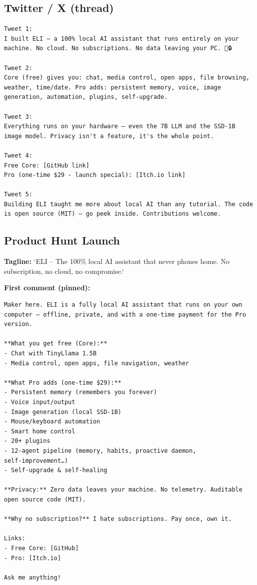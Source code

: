 \documentclass[11pt,a4paper]{article}
\begin{document}
\subsection{Twitter / X (thread)}
\begin{tcolorbox}[title=Twitter Thread, colback=cyan!5]
\begin{verbatim}
Tweet 1:
I built ELI – a 100% local AI assistant that runs entirely on your machine. No cloud. No subscriptions. No data leaving your PC. 🧠🔒

Tweet 2:
Core (free) gives you: chat, media control, open apps, file browsing, weather, time/date. Pro adds: persistent memory, voice, image generation, automation, plugins, self‑upgrade.

Tweet 3:
Everything runs on your hardware – even the 7B LLM and the SSD‑1B image model. Privacy isn't a feature, it's the whole point.

Tweet 4:
Free Core: [GitHub link]
Pro (one‑time $29 - launch special): [Itch.io link]

Tweet 5:
Building ELI taught me more about local AI than any tutorial. The code is open source (MIT) – go peek inside. Contributions welcome.
\end{verbatim}
\end{tcolorbox}

\subsection{Product Hunt Launch}
\begin{tcolorbox}[title=Product Hunt, colback=orange!5]
\textbf{Tagline:} `ELI – The 100\% local AI assistant that never phones home. No subscription, no cloud, no compromise.`

\textbf{First comment (pinned):}
\begin{verbatim}
Maker here. ELI is a fully local AI assistant that runs on your own computer – offline, private, and with a one‑time payment for the Pro version.

**What you get free (Core):**
- Chat with TinyLlama 1.5B
- Media control, open apps, file navigation, weather

**What Pro adds (one‑time $29):**
- Persistent memory (remembers you forever)
- Voice input/output
- Image generation (local SSD‑1B)
- Mouse/keyboard automation
- Smart home control
- 20+ plugins
- 12‑agent pipeline (memory, habits, proactive daemon, self‑improvement…)
- Self‑upgrade & self‑healing

**Privacy:** Zero data leaves your machine. No telemetry. Auditable open source code (MIT).

**Why no subscription?** I hate subscriptions. Pay once, own it.

Links:
- Free Core: [GitHub]
- Pro: [Itch.io]

Ask me anything!
\end{verbatim}
\end{tcolorbox}
\end{document}
